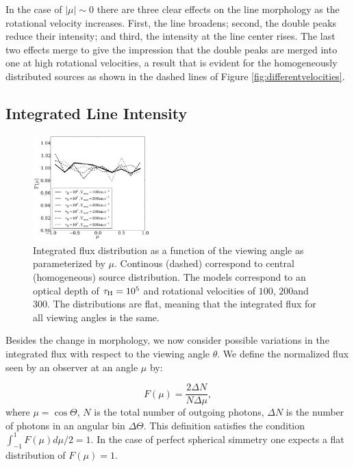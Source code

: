 \documentclass{emulateapj}
\newcommand{\kms}{{\ifmmode{{\mathrm{\,km\ s}^{-1}}}\else{\,km~s$^{-1}$}\fi}}
\begin{document}
In the case of $|\mu|\sim 0$ there are three clear effects on the
line morphology as the rotational velocity increases. First, the
line broadens; second, the double peaks reduce their intensity; and
third, the intensity at the line center rises. The last two effects
merge to give the impression that the double peaks are merged into one
at high rotational velocities, a result that is evident for the
homogeneously distributed sources as shown in the dashed lines of
Figure \ref{fig:differentvelocities}. 


\subsection{Integrated Line Intensity}

\begin{figure}
\begin{center}
  \includegraphics[width=0.4\textwidth]{f5.pdf}
\end{center}
\caption{Integrated flux distribution as a function of the
  viewing angle as parameterized by $\mu$. Continous (dashed)
  correspond to central (homogeneous) source distribution.
  The models correspond to an optical depth of $\tau_{\rm
    H}=10^5$ and rotational velocities of $100$\kms, $200$\kms and
  $300$\kms. The distributions are flat, meaning that the integrated
  flux for all viewing angles is the same.
\label{fig:muhisto}}
\end{figure}

Besides the change in morphology, we now consider possible variations
in the integrated flux with respect to the viewing angle $\theta$. We
define the normalized flux seen by an observer at an angle $\mu$ by: 


\begin{equation}
F(\mu) = \frac{2\Delta N}{N\Delta \mu}, 
\end{equation} 
%
where $\mu=\cos\Theta$, $N$ is the total number of outgoing photons,
$\Delta N$ is the number of photons in an angular bin $\Delta
\Theta$. This definition satisfies the condition
$\int_{-1}^{1}F(\mu)d\mu/2=1$.  In the case of perfect spherical
simmetry one expects a flat distribution of $F(\mu)=1$.
\end{document}
